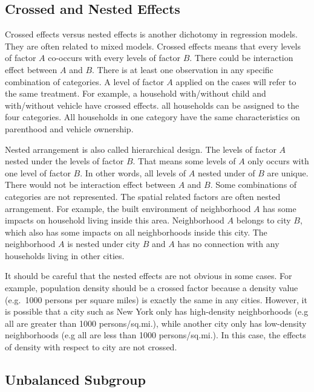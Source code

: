 \documentclass[
  11pt,
  openany]{memoir}
\begin{document}
\hypertarget{crossed-and-nested-effects}{%
\subsection{Crossed and Nested Effects}\label{crossed-and-nested-effects}}

Crossed effects versus nested effects is another dichotomy in regression models. They are often related to mixed models.
Crossed effects means that every levels of factor \(A\) co-occurs with every levels of factor \(B\).
There could be interaction effect between \(A\) and \(B\).
There is at least one observation in any specific combination of categories.
A level of factor \(A\) applied on the cases will refer to the same treatment.
For example, a household with/without child and with/without vehicle have crossed effects. all households can be assigned to the four categories. All households in one category have the same characteristics on parenthood and vehicle ownership.

Nested arrangement is also called hierarchical design. The levels of factor \(A\) nested under the levels of factor \(B\). That means some levels of \(A\) only occurs with one level of factor \(B\).
In other words, all levels of \(A\) nested under of \(B\) are unique.
There would not be interaction effect between \(A\) and \(B\). Some combinations of categories are not represented.
The spatial related factors are often nested arrangement. For example, the built environment of neighborhood \(A\) has some impacts on household living inside this area. Neighborhood \(A\) belongs to city \(B\), which also has some impacts on all neighborhoods inside this city. The neighborhood \(A\) is nested under city \(B\) and \(A\) has no connection with any households living in other cities.

It should be careful that the nested effects are not obvious in some cases.
For example, population density should be a crossed factor because a density value (e.g.~1000 persons per square miles) is exactly the same in any cities.
However, it is possible that a city such as New York only has high-density neighborhoods (e.g all are greater than 1000 persons/sq.mi.), while another city only has low-density neighborhoods (e.g all are less than 1000 persons/sq.mi.).
In this case, the effects of density with respect to city are not crossed.

\hypertarget{unbalanced-subgroup}{%
\subsection{Unbalanced Subgroup}\label{unbalanced-subgroup}}
\end{document}
